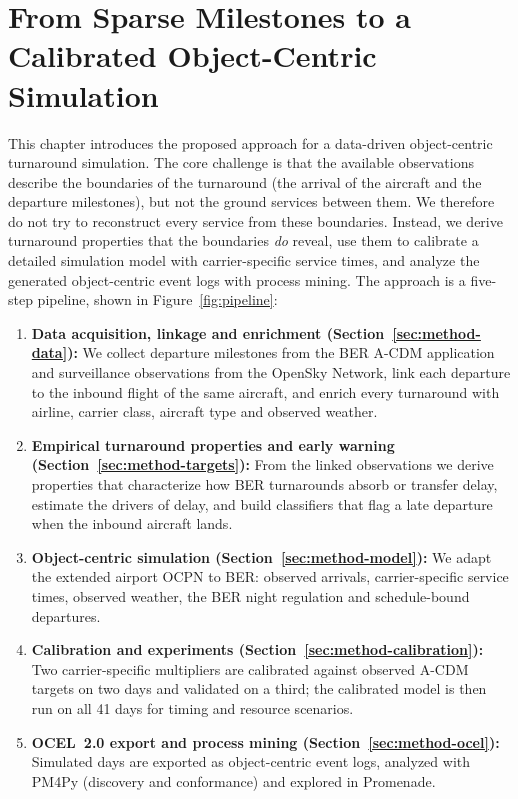 \chapter{From Sparse Milestones to a Calibrated Object-Centric Simulation}
\label{ch:methods}

This chapter introduces the proposed approach for a data-driven object-centric turnaround simulation. The core challenge is that the available observations describe the boundaries of the turnaround (the arrival of the aircraft and the departure milestones), but not the ground services between them. We therefore do not try to reconstruct every service from these boundaries. Instead, we derive turnaround properties that the boundaries \emph{do} reveal, use them to calibrate a detailed simulation model with carrier-specific service times, and analyze the generated object-centric event logs with process mining. The approach is a five-step pipeline, shown in Figure~\ref{fig:pipeline}:

\begin{enumerate}
\item \textbf{Data acquisition, linkage and enrichment (Section~\ref{sec:method-data}):} We collect departure milestones from the BER A-CDM application and surveillance observations from the OpenSky Network, link each departure to the inbound flight of the same aircraft, and enrich every turnaround with airline, carrier class, aircraft type and observed weather.
\item \textbf{Empirical turnaround properties and early warning (Section~\ref{sec:method-targets}):} From the linked observations we derive properties that characterize how BER turnarounds absorb or transfer delay, estimate the drivers of delay, and build classifiers that flag a late departure when the inbound aircraft lands.
\item \textbf{Object-centric simulation (Section~\ref{sec:method-model}):} We adapt the extended airport OCPN to BER: observed arrivals, carrier-specific service times, observed weather, the BER night regulation and schedule-bound departures.
\item \textbf{Calibration and experiments (Section~\ref{sec:method-calibration}):} Two carrier-specific multipliers are calibrated against observed A-CDM targets on two days and validated on a third; the calibrated model is then run on all 41 days for timing and resource scenarios.
\item \textbf{OCEL~2.0 export and process mining (Section~\ref{sec:method-ocel}):} Simulated days are exported as object-centric event logs, analyzed with PM4Py (discovery and conformance) and explored in Promenade.
\end{enumerate}

